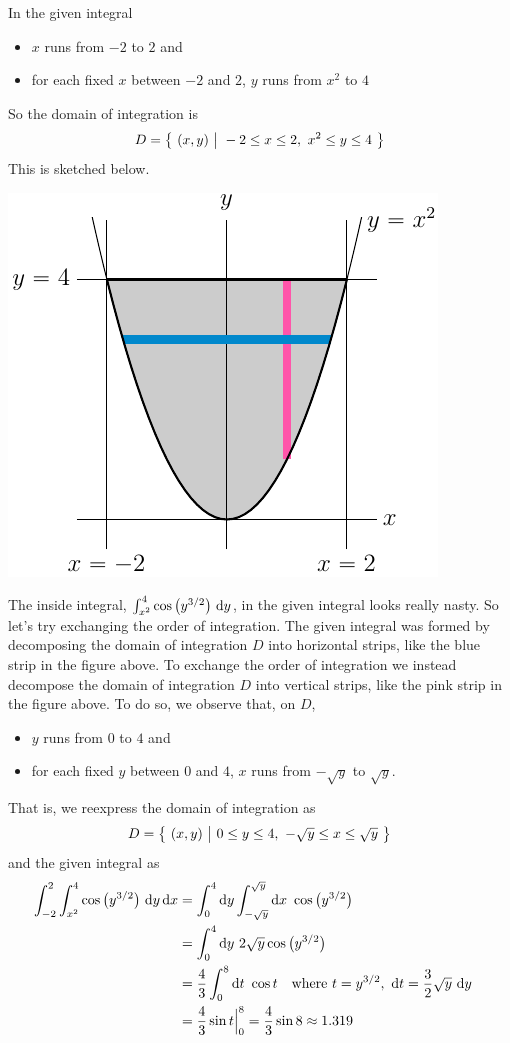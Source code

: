 \begin{solution}
In the given integral
\begin{itemize}
\item 
$x$ runs from $-2$ to $2$ and
\item
for each fixed $x$ between $-2$ and $2$, $y$ runs from $x^2$ to $4$
\end{itemize}
So the domain of integration is 
\begin{equation*}
D = \big\{ \ (x,y)\ \big|\ -2\le x\le 2,\  x^2\le y\le 4\ \big\}
\end{equation*}
This is sketched below. 
\begin{center}
     \includegraphics{fig/OE02DQ6.pdf}
\end{center}
The inside integral, $\int_{x^2}^4\cos\big(y^{3/2}\big)\ \mathrm{d}y$,
in the given integral looks really nasty.  So let's try exchanging
the order of integration. The given integral was formed by decomposing
the domain of integration $D$ into horizontal strips, like the blue strip
in the figure above. To exchange the order of integration we instead
decompose the domain of integration $D$ into vertical strips, 
like the pink strip in the figure above. To do so, we observe that, on $D$,
\begin{itemize}
\item 
$y$ runs from $0$ to $4$ and
\item
for each fixed $y$ between $0$ and $4$, $x$ runs from $-\sqrt{y}$ to $\sqrt{y}$.
\end{itemize}
That is, we reexpress the domain of integration as 
\begin{equation*}
D = \big\{ \ (x,y)\ \big|\ 0\le y\le 4,\  -\sqrt{y}\le x\le \sqrt{y}\ \big\}
\end{equation*}
and the given integral as
\begin{align*}
\int_{-2}^2\int_{x^2}^4\cos\big(y^{3/2}\big)\ \dee{y}\,\dee{x}
&=\int_0^4\dee{y} \int_{-\sqrt{y}}^{\sqrt{y}}\dee{x}\ \cos\big(y^{3/2}\big)\cr
&=\int_0^4\dee{y} \ 2\sqrt{y}\cos\big(y^{3/2}\big)\cr
&=\frac{4}{3}\int_0^8\dee{t}\ \cos t\quad\hbox{where }
    t=y^{3/2},\ \dee{t}=\frac{3}{2}\sqrt{y}\ \dee{y}\cr
&=\frac{4}{3}\sin t\Big|_0^8
=\frac{4}{3}\sin 8\approx 1.319
\end{align*}
\end{solution}

